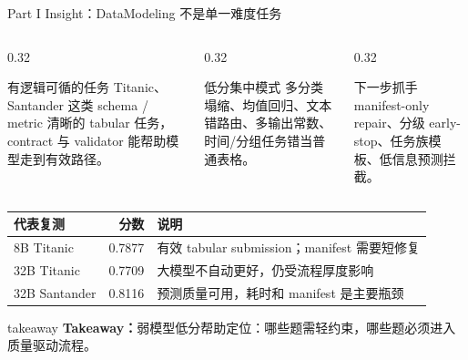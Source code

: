 \documentclass[aspectratio=169,UTF8]{ctexbeamer}
\newcommand{\takeaway}[1]{%
  \vspace{0.35em}
  \begin{beamercolorbox}[wd=\textwidth,sep=0.75ex,rounded=true]{takeaway}
    \textbf{Takeaway：}#1
  \end{beamercolorbox}
}
\begin{document}
\begin{frame}{Part I Insight：DataModeling 不是单一难度任务}
\footnotesize
\begin{columns}[T]
\begin{column}{0.32\textwidth}
\begin{block}{有逻辑可循的任务}
Titanic、Santander 这类 schema / metric 清晰的 tabular 任务，contract 与 validator 能帮助模型走到有效路径。
\end{block}
\end{column}
\begin{column}{0.32\textwidth}
\begin{block}{低分集中模式}
多分类塌缩、均值回归、文本错路由、多输出常数、时间/分组任务错当普通表格。
\end{block}
\end{column}
\begin{column}{0.32\textwidth}
\begin{alertblock}{下一步抓手}
manifest-only repair、分级 early-stop、任务族模板、低信息预测拦截。
\end{alertblock}
\end{column}
\end{columns}
\vspace{0.25em}
\begin{tabularx}{\textwidth}{p{} r X}
\toprule
代表复测 & 分数 & 说明 \\
\midrule
8B Titanic & 0.7877 & 有效 tabular submission；manifest 需要短修复 \\
32B Titanic & 0.7709 & 大模型不自动更好，仍受流程厚度影响 \\
32B Santander & 0.8116 & 预测质量可用，耗时和 manifest 是主要瓶颈 \\
\bottomrule
\end{tabularx}
\takeaway{弱模型低分帮助定位：哪些题需轻约束，哪些题必须进入质量驱动流程。}
\end{frame}
\end{document}
